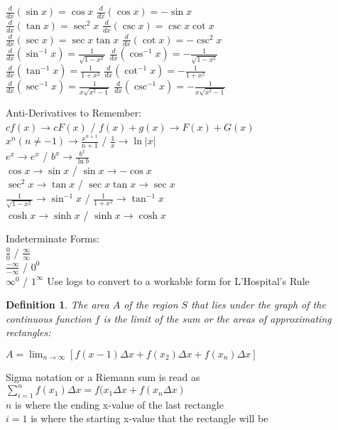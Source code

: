 \documentclass[10pt,a4paper]{article}
\newtheorem{definition}{Definition}
\begin{document}
	$\frac{d}{dx}(\sin{x}) = \cos{x}$ \space $\frac{d}{dx}(\cos{x}) = -\sin{x}$
	\\	$\frac{d}{dx}(\tan{x}) = \sec^{2}{x}$	$\frac{d}{dx}(\csc{x}) = \csc{x}\cot{x}$
	\\	$\frac{d}{dx}(\sec{x})= \sec{x}\tan{x}$	$\frac{d}{dx}(\cot{x}) = -\csc^{2}{x}$
	\\	$\frac{d}{dx}(\sin^{-1}{x}) = \frac{1}{\sqrt{1-x^{2}}}$	$\frac{d}{dx}(\cos^{-1}{x}) = -\frac{1}{\sqrt{1-x^{2}}}$
	\\	$\frac{d}{dx}(\tan^{-1}{x}) = \frac{1}{1+x^{2}}$ $\frac{d}{dx}(\cot^{-1}{x}) = -\frac{1}{1+x^{2}}$
	\\ $\frac{d}{dx}(\sec^{-1}{x}) = \frac{1}{x\sqrt{x^{2}-1}}$ $\frac{d}{dx}(\csc^{-1}{x}) = -\frac{1}{x\sqrt{x^{2}-1}}$
	
Anti-Derivatives to Remember:
\\ $cf(x) \rightarrow cF(x)$  /  $f(x) + g(x) \rightarrow F(x) + G(x)$
\\ $x^{n}(n \neq -1) \rightarrow \frac{x^{n+1}}{n+1}$ /  $\frac{1}{x} \rightarrow \ln{|x|}$
\\ $e^{x} \rightarrow e^{x}$ /  $b^{x} \rightarrow \frac{b^{x}}{\ln{b}}$
\\ $\cos{x} \rightarrow \sin{x} $ /  $\sin{x} \rightarrow -\cos{x}$
\\ $\sec^{2}{x} \rightarrow \tan{x}$  / $\sec{x} \tan{x} \rightarrow \sec{x}$
\\ $\frac{1}{\sqrt{1-x^{2}}} \rightarrow \sin^{-1}{x}$ /  $\frac{1}{1+x^{2}} \rightarrow \tan^{-1}{x}$
\\ $\cosh{x} \rightarrow \sinh{x}$ /  $\sinh{x} \rightarrow \cosh{x}$	

 Indeterminate Forms:
\\ $\frac{0}{0}$ / $\frac{\infty}{\infty}$
\\ $\frac{-\infty}{-\infty}$ / $0^{0}$
\\ $ \infty^{0}$ / $1^{\infty}$
Use logs to convert to a workable form for L'Hospital's Rule
		\begin{definition}
		The area $A$ of the region $S$ that lies under the graph of the continuous function $f$ is the limit of the sum or the areas of approximating rectangles:
		\begin{center}
			$A=\lim_{n\rightarrow \infty}{[f(x-1)\Delta{x}+f(x_2)\Delta{x} + f(x_n)\Delta{x}]}$
		\end{center}
	\end{definition} 
		Sigma notation or a Riemann sum is read as $\sum_{i=1}^{n} f(x_{1})\Delta{x} = f(x_{1}\Delta{x} + f(x_{n}\Delta{x})$
	\\			$n$ is where the ending x-value of the last rectangle
	\\			$i=1$ is where the starting x-value that the rectangle will be
\end{document}
